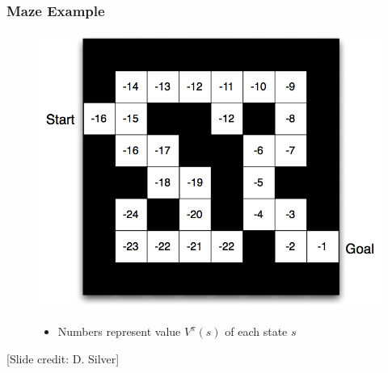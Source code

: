 \documentclass[handout]{beamer}
\begin{document}
\begin{frame}\frametitle{Maze Example}\small
\begin{figure}
\begin{minipage}{0.5\linewidth}
\includegraphics[width=\linewidth]{Figures/maze3}
\end{minipage}
\hspace{3mm}
\begin{minipage}{0.45\linewidth}
\begin{itemize}
\item Numbers represent value $V^{\pi}(s)$ of each state $s$
\end{itemize}
\end{minipage}
\end{figure}

\vspace{14mm}
\scriptsize [Slide credit: D. Silver]
\end{frame}

\end{document}
